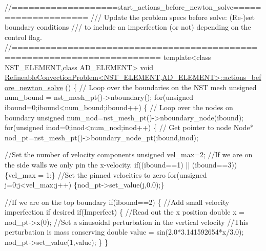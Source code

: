 
\begin{DoxyCodeInclude}
\textcolor{comment}{//===================start\_actions\_before\_newton\_solve====================}
\textcolor{comment}{/// Update the problem specs before solve: (Re-)set boundary conditions}
\textcolor{comment}{}\textcolor{comment}{/// to include an imperfection (or not) depending on the control flag.}
\textcolor{comment}{}\textcolor{comment}{//========================================================================}
\textcolor{keyword}{template}<\textcolor{keyword}{class} NST\_ELEMENT,\textcolor{keyword}{class} AD\_ELEMENT>
\textcolor{keywordtype}{void} 
      \hyperlink{classRefineableConvectionProblem_a694f0be87fe09a30d94e92acfce85eee}{RefineableConvectionProblem<NST\_ELEMENT,AD\_ELEMENT>::actions\_before\_newton\_solve}
      ()
\{
 \textcolor{comment}{// Loop over the boundaries on the NST mesh}
 \textcolor{keywordtype}{unsigned} num\_bound = nst\_mesh\_pt()->nboundary();
 \textcolor{keywordflow}{for}(\textcolor{keywordtype}{unsigned} ibound=0;ibound<num\_bound;ibound++)
  \{
   \textcolor{comment}{// Loop over the nodes on boundary }
   \textcolor{keywordtype}{unsigned} num\_nod=nst\_mesh\_pt()->nboundary\_node(ibound);
   \textcolor{keywordflow}{for}(\textcolor{keywordtype}{unsigned} inod=0;inod<num\_nod;inod++)
    \{
     \textcolor{comment}{// Get pointer to node}
     Node* nod\_pt=nst\_mesh\_pt()->boundary\_node\_pt(ibound,inod);

     \textcolor{comment}{//Set the number of velocity components}
     \textcolor{keywordtype}{unsigned} vel\_max=2;
     \textcolor{comment}{//If we are on the side walls we only pin the x-velocity.}
     \textcolor{keywordflow}{if}((ibound==1) || (ibound==3)) \{vel\_max = 1;\}
     \textcolor{comment}{//Set the pinned velocities to zero}
     \textcolor{keywordflow}{for}(\textcolor{keywordtype}{unsigned} j=0;j<vel\_max;j++) \{nod\_pt->set\_value(j,0.0);\}

     \textcolor{comment}{//If we are on the top boundary}
     \textcolor{keywordflow}{if}(ibound==2) 
      \{
       \textcolor{comment}{//Add small velocity imperfection if desired}
       \textcolor{keywordflow}{if}(Imperfect)
        \{
         \textcolor{comment}{//Read out the x position}
         \textcolor{keywordtype}{double} x = nod\_pt->x(0);
         \textcolor{comment}{//Set a sinusoidal perturbation in the vertical velocity}
         \textcolor{comment}{//This perturbation is mass conserving}
         \textcolor{keywordtype}{double} value = sin(2.0*3.141592654*x/3.0);
         nod\_pt->set\_value(1,value);
        \}
      \}


\end{DoxyCodeInclude}
